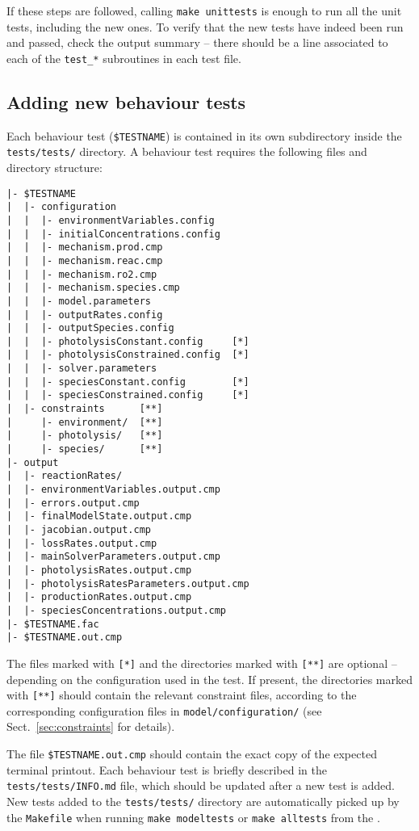 If these steps are followed, calling \texttt{make\ unittests} is
enough to run all the unit tests, including the new ones. To verify
that the new tests have indeed been run and passed, check the output
summary -- there should be a line associated to each of the
\texttt{test\_*} subroutines in each test file.

\subsection{Adding new behaviour tests} \label{subsec:adding-new-behaviour-tests}

Each behaviour test (\texttt{\$TESTNAME}) is contained in its own
subdirectory inside the \texttt{tests/tests/} directory. A behaviour
test requires the following files and directory structure:

\begin{verbatim}
|- $TESTNAME
|  |- configuration
|  |  |- environmentVariables.config
|  |  |- initialConcentrations.config
|  |  |- mechanism.prod.cmp
|  |  |- mechanism.reac.cmp
|  |  |- mechanism.ro2.cmp
|  |  |- mechanism.species.cmp
|  |  |- model.parameters
|  |  |- outputRates.config
|  |  |- outputSpecies.config
|  |  |- photolysisConstant.config     [*]
|  |  |- photolysisConstrained.config  [*]
|  |  |- solver.parameters
|  |  |- speciesConstant.config        [*]
|  |  |- speciesConstrained.config     [*]
|  |- constraints      [**]
|     |- environment/  [**]
|     |- photolysis/   [**]
|     |- species/      [**]
|- output
|  |- reactionRates/
|  |- environmentVariables.output.cmp
|  |- errors.output.cmp
|  |- finalModelState.output.cmp
|  |- jacobian.output.cmp
|  |- lossRates.output.cmp
|  |- mainSolverParameters.output.cmp
|  |- photolysisRates.output.cmp
|  |- photolysisRatesParameters.output.cmp
|  |- productionRates.output.cmp
|  |- speciesConcentrations.output.cmp
|- $TESTNAME.fac
|- $TESTNAME.out.cmp
\end{verbatim}

The files marked with \texttt{[*]} and the directories marked with
\texttt{[**]} are optional -- depending on the configuration used in
the test. If present, the directories marked with \texttt{[**]} should
contain the relevant constraint files, according to the corresponding
configuration files in \texttt{model/configuration/} (see
Sect.~\ref{sec:constraints} for details).

The file \texttt{\$TESTNAME.out.cmp} should contain the exact copy of the
expected terminal printout. Each behaviour test is briefly described in the
\texttt{tests/tests/INFO.md} file, which should be updated after a new test is
added. New tests added to the \texttt{tests/tests/} directory are
automatically picked up by the \texttt{Makefile} when running
\verb|make modeltests| or \verb|make alltests| from the \maindir.

